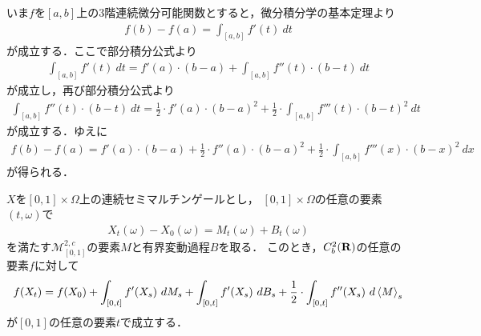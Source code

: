 	いま$f$を$[a,b]$上の$3$階連続微分可能関数とすると，微分積分学の基本定理より
	\begin{align}
		f(b) - f(a) = \int_{[a,b]} f'(t)\ dt
	\end{align}
	が成立する．ここで部分積分公式より
	\begin{align}
		\int_{[a,b]} f'(t)\ dt
		= f'(a) \cdot (b-a) + \int_{[a,b]} f''(t) \cdot (b-t)\ dt
	\end{align}
	が成立し，再び部分積分公式より
	\begin{align}
		\int_{[a,b]} f''(t) \cdot (b-t)\ dt
		= \frac{1}{2} \cdot f'(a) \cdot (b-a)^{2} 
		+ \frac{1}{2} \cdot \int_{[a,b]} f'''(t) \cdot (b-t)^{2}\ dt
	\end{align}
	が成立する．ゆえに
	\begin{align}
		f(b) - f(a) = f'(a) \cdot (b-a) + \frac{1}{2} \cdot f''(a) \cdot (b-a)^{2}
		+ \frac{1}{2} \cdot \int_{[a,b]} f'''(x) \cdot (b-x)^{2}\ dx
	\end{align}
	が得られる．
	
	\begin{screen}
		\begin{thm}[伊藤の公式]
			$X$を$[0,1] \times \Omega$上の連続セミマルチンゲールとし，
			$[0,1] \times \Omega$の任意の要素$(t,\omega)$で
			\begin{align}
				X_{t}(\omega) - X_{0}(\omega) = M_{t}(\omega) + B_{t}(\omega)
			\end{align}
			を満たす$\mathscr{M}^{2,c}_{[0,1]}$の要素$M$と有界変動過程$B$を取る．
			このとき，$C^{2}_{b}(\mathbf{R})$の任意の要素$f$に対して
			\begin{align}
				f(X_t) = f(X_{0}) + \int_{[0,t]} f'(X_{s})\ dM_{s}
				+ \int_{[0,t]} f'(X_{s})\ dB_{s}
				+ \frac{1}{2} \cdot \int_{[0,t]} f''(X_{s})\ d\inprod<M>_{s}
			\end{align}
			が$[0,1]$の任意の要素$t$で成立する．
		\end{thm}
	\end{screen}
	
